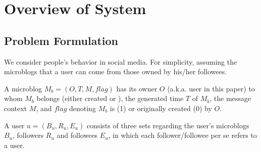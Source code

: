\section{Overview of System \sys{}}
\label{sec:overv}


\subsection{Problem Formulation}

We consider people's \retg{} behavior in social media.
For simplicity, assuming the microblogs that a user can \ret{} come from those owned by his/her followees.


\begin{definition}
\label{def:blog}
A microblog $M_b = (O, T, M, flag)$ has its owner $O$ (a.k.a. user in this paper) to whom $M_b$ belongs (either created or \retd{}), the generated time $T$ of $M_b$, the message context $M$, and $flag$ denoting $M_b$ is \retd{} (1) or originally created (0) by $O$.
\end{definition}

\begin{definition}
\label{def:user}
A user $u = (B_u, R_u, E_u)$ consists of three sets regarding the user's microblogs $B_u$, followers $R_u$ and followees $E_u$, in which each follower/followee per se refers to a user.
\end{definition}

